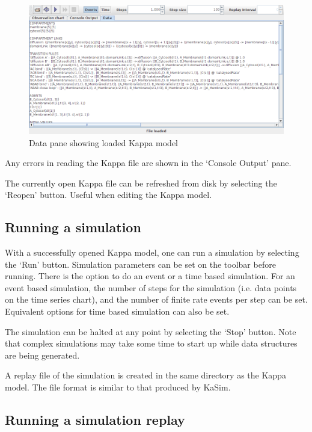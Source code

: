 \documentclass[english]{report}
\begin{document}
\begin{figure}[h!]
 \centering
 \includegraphics[scale=0.45]{./images/FileOpenDataPane.png}
 \caption{Data pane showing loaded Kappa model}
 \label{fig:dataPane}
\end{figure}

Any errors in reading the Kappa file are shown in the `Console Output' pane.

The currently open Kappa file can be refreshed from disk by selecting the `Reopen' button. Useful when editing the Kappa model.

\subsection{Running a simulation}

With a successfully opened Kappa model, one can run a simulation by selecting the `Run' button. Simulation parameters can be set on the toolbar before running. There is the option to do an event or a time based simulation. For an event based simulation, the number of steps for the simulation (i.e. data points on the time series chart), and the number of finite rate events per step can be set. Equivalent options for time based simulation can also be set.

The simulation can be halted at any point by selecting the `Stop' button. Note that complex simulations may take some time to start up while data structures are being generated.

A replay file of the simulation is created in the same directory as the Kappa model. The file format is similar to that produced by KaSim.

\subsection{Running a simulation replay}
\end{document}
